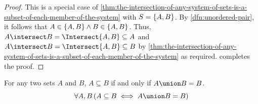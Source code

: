 \begin{proof}
    This is a special case of \cref{thm:the-intersection-of-any-system-of-sets-is-a-subset-of-each-member-of-the-system}
    with \( S = \mleft\{ A,B \mright\} \). By \cref{dfn:unordered-pair}, it follows that \( A \in \mleft\{ A,B \mright\}
    \land B \in \mleft\{ A,B \mright\} \). Thus, \( A \intersect B = \Intersect \mleft\{ A,B \mright\} \subseteq A \) and
    \( A \intersect B = \Intersect \mleft\{ A,B \mright\} \subseteq B \) by \cref{thm:the-intersection-of-any-system-of-sets-is-a-subset-of-each-member-of-the-system}
    as required.  completes the proof.
\end{proof}

\begin{thm}
    \label{thm:subset-in-terms-of-union}
    For any two sets \( A \) and \( B \), \( A \subseteq B \) if and only if
    \( A \union B = B \).
    \begin{equation*}
        \forall A,B \, \mleft( A \subseteq B \iff A \union B = B \mright)
    \end{equation*}
\end{thm}

